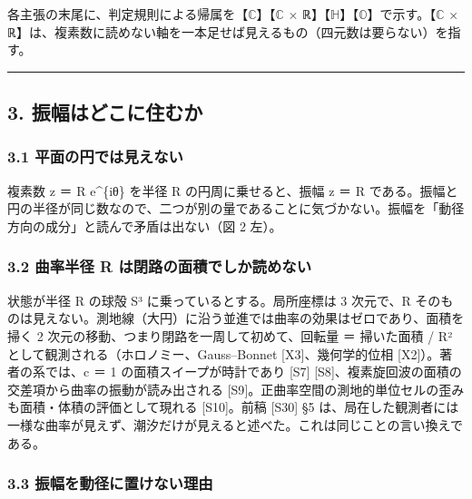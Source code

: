 \documentclass[
  a4paper,
]{ltjsarticle}
\begin{document}
各主張の末尾に、判定規則による帰属を【\(\mathbb{C}\)】【\(\mathbb{C}\) ×
ℝ】【\(\mathbb{H}\)】【\(\mathbb{O}\)】で示す。【\(\mathbb{C}\) ×
ℝ】は、複素数に読めない軸を一本足せば見えるもの（四元数は要らない）を指す。

\begin{center}\rule{0.5\linewidth}{0.5pt}\end{center}

\subsection{3.
振幅はどこに住むか}\label{ux632fux5e45ux306fux3069ux3053ux306bux4f4fux3080ux304b}

\subsubsection{3.1
平面の円では見えない}\label{ux5e73ux9762ux306eux5186ux3067ux306fux898bux3048ux306aux3044}

複素数 z ＝ R e\^{}\{iθ\} を半径 R の円周に乗せると、振幅
\textbar z\textbar{} ＝ R
である。振幅と円の半径が同じ数なので、二つが別の量であることに気づかない。振幅を「動径方向の成分」と読んで矛盾は出ない（図
2 左）。

\subsubsection{3.2 曲率半径 R
は閉路の面積でしか読めない}\label{ux66f2ux7387ux534aux5f84-r-ux306fux9589ux8defux306eux9762ux7a4dux3067ux3057ux304bux8aadux3081ux306aux3044}

状態が半径 R の球殻 S³ に乗っているとする。局所座標は 3 次元で、R
そのものは見えない。測地線（大円）に沿う並進では曲率の効果はゼロであり、面積を掃く
2 次元の移動、つまり閉路を一周して初めて、回転量 ＝ 掃いた面積 / R²
として観測される（ホロノミー、Gauss--Bonnet {[}X3{]}、幾何学的位相
{[}X2{]}）。著者の系では、c ＝ 1 の面積スイープが時計であり {[}S7{]}
{[}S8{]}、複素旋回波の面積の交差項から曲率の振動が読み出される
{[}S9{]}。正曲率空間の測地的単位セルの歪みも面積・体積の評価として現れる
{[}S10{]}。前稿 {[}S30{]} §5
は、局在した観測者には一様な曲率が見えず、潮汐だけが見えると述べた。これは同じことの言い換えである。

\subsubsection{3.3
振幅を動径に置けない理由}\label{ux632fux5e45ux3092ux52d5ux5f84ux306bux7f6eux3051ux306aux3044ux7406ux7531}
\end{document}
